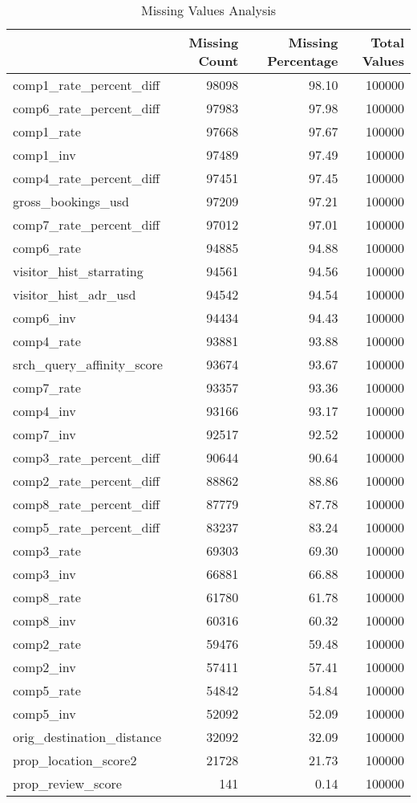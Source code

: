\begin{table}
\caption{Missing Values Analysis}
\label{tab:missing_values}
\begin{tabular}{lrrr}
\toprule
 & Missing Count & Missing Percentage & Total Values \\
\midrule
comp1\_rate\_percent\_diff & 98098 & 98.10 & 100000 \\
comp6\_rate\_percent\_diff & 97983 & 97.98 & 100000 \\
comp1\_rate & 97668 & 97.67 & 100000 \\
comp1\_inv & 97489 & 97.49 & 100000 \\
comp4\_rate\_percent\_diff & 97451 & 97.45 & 100000 \\
gross\_bookings\_usd & 97209 & 97.21 & 100000 \\
comp7\_rate\_percent\_diff & 97012 & 97.01 & 100000 \\
comp6\_rate & 94885 & 94.88 & 100000 \\
visitor\_hist\_starrating & 94561 & 94.56 & 100000 \\
visitor\_hist\_adr\_usd & 94542 & 94.54 & 100000 \\
comp6\_inv & 94434 & 94.43 & 100000 \\
comp4\_rate & 93881 & 93.88 & 100000 \\
srch\_query\_affinity\_score & 93674 & 93.67 & 100000 \\
comp7\_rate & 93357 & 93.36 & 100000 \\
comp4\_inv & 93166 & 93.17 & 100000 \\
comp7\_inv & 92517 & 92.52 & 100000 \\
comp3\_rate\_percent\_diff & 90644 & 90.64 & 100000 \\
comp2\_rate\_percent\_diff & 88862 & 88.86 & 100000 \\
comp8\_rate\_percent\_diff & 87779 & 87.78 & 100000 \\
comp5\_rate\_percent\_diff & 83237 & 83.24 & 100000 \\
comp3\_rate & 69303 & 69.30 & 100000 \\
comp3\_inv & 66881 & 66.88 & 100000 \\
comp8\_rate & 61780 & 61.78 & 100000 \\
comp8\_inv & 60316 & 60.32 & 100000 \\
comp2\_rate & 59476 & 59.48 & 100000 \\
comp2\_inv & 57411 & 57.41 & 100000 \\
comp5\_rate & 54842 & 54.84 & 100000 \\
comp5\_inv & 52092 & 52.09 & 100000 \\
orig\_destination\_distance & 32092 & 32.09 & 100000 \\
prop\_location\_score2 & 21728 & 21.73 & 100000 \\
prop\_review\_score & 141 & 0.14 & 100000 \\
\bottomrule
\end{tabular}
\end{table}
